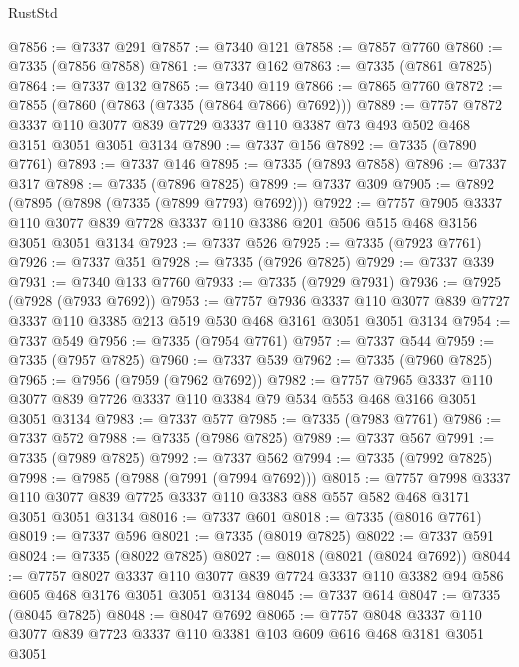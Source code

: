 \begin{lexlean}{RustStd}
\begin{coremodule}
@7856 := @7337 @291
@7857 := @7340 @121
@7858 := @7857 @7760
@7860 := @7335 (@7856 @7858)
@7861 := @7337 @162
@7863 := @7335 (@7861 @7825)
@7864 := @7337 @132
@7865 := @7340 @119
@7866 := @7865 @7760
@7872 := @7855 (@7860 (@7863 (@7335 (@7864 @7866) @7692)))
@7889 := @7757
    @7872
    @3337
    @110
    @3077
    @839
    @7729
    @3337
    @110
    @3387
    @73
    @493
    @502
    @468
    @3151
    @3051
    @3051
    @3134
@7890 := @7337 @156
@7892 := @7335 (@7890 @7761)
@7893 := @7337 @146
@7895 := @7335 (@7893 @7858)
@7896 := @7337 @317
@7898 := @7335 (@7896 @7825)
@7899 := @7337 @309
@7905 := @7892 (@7895 (@7898 (@7335 (@7899 @7793) @7692)))
@7922 := @7757
    @7905
    @3337
    @110
    @3077
    @839
    @7728
    @3337
    @110
    @3386
    @201
    @506
    @515
    @468
    @3156
    @3051
    @3051
    @3134
@7923 := @7337 @526
@7925 := @7335 (@7923 @7761)
@7926 := @7337 @351
@7928 := @7335 (@7926 @7825)
@7929 := @7337 @339
@7931 := @7340 @133 @7760
@7933 := @7335 (@7929 @7931)
@7936 := @7925 (@7928 (@7933 @7692))
@7953 := @7757
    @7936
    @3337
    @110
    @3077
    @839
    @7727
    @3337
    @110
    @3385
    @213
    @519
    @530
    @468
    @3161
    @3051
    @3051
    @3134
@7954 := @7337 @549
@7956 := @7335 (@7954 @7761)
@7957 := @7337 @544
@7959 := @7335 (@7957 @7825)
@7960 := @7337 @539
@7962 := @7335 (@7960 @7825)
@7965 := @7956 (@7959 (@7962 @7692))
@7982 := @7757
    @7965
    @3337
    @110
    @3077
    @839
    @7726
    @3337
    @110
    @3384
    @79
    @534
    @553
    @468
    @3166
    @3051
    @3051
    @3134
@7983 := @7337 @577
@7985 := @7335 (@7983 @7761)
@7986 := @7337 @572
@7988 := @7335 (@7986 @7825)
@7989 := @7337 @567
@7991 := @7335 (@7989 @7825)
@7992 := @7337 @562
@7994 := @7335 (@7992 @7825)
@7998 := @7985 (@7988 (@7991 (@7994 @7692)))
@8015 := @7757
    @7998
    @3337
    @110
    @3077
    @839
    @7725
    @3337
    @110
    @3383
    @88
    @557
    @582
    @468
    @3171
    @3051
    @3051
    @3134
@8016 := @7337 @601
@8018 := @7335 (@8016 @7761)
@8019 := @7337 @596
@8021 := @7335 (@8019 @7825)
@8022 := @7337 @591
@8024 := @7335 (@8022 @7825)
@8027 := @8018 (@8021 (@8024 @7692))
@8044 := @7757
    @8027
    @3337
    @110
    @3077
    @839
    @7724
    @3337
    @110
    @3382
    @94
    @586
    @605
    @468
    @3176
    @3051
    @3051
    @3134
@8045 := @7337 @614
@8047 := @7335 (@8045 @7825)
@8048 := @8047 @7692
@8065 := @7757
    @8048
    @3337
    @110
    @3077
    @839
    @7723
    @3337
    @110
    @3381
    @103
    @609
    @616
    @468
    @3181
    @3051
    @3051

\end{coremodule}
\end{lexlean}

